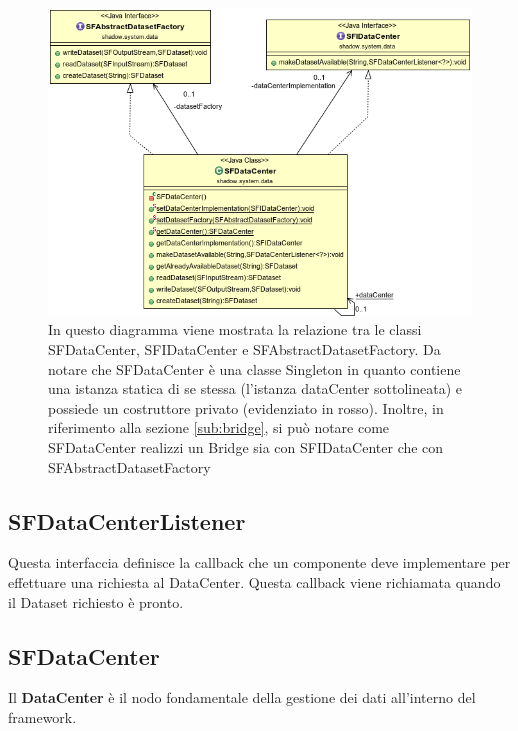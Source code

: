 \begin{figure}
\begin{center}
\includegraphics[width=\textwidth]{Immagini/DataCenterBridge}
\caption{In questo diagramma viene mostrata la relazione tra le classi SFDataCenter, SFIDataCenter e SFAbstractDatasetFactory. Da notare che SFDataCenter \`e una classe Singleton in quanto contiene una istanza statica di se stessa (l'istanza dataCenter sottolineata) e possiede un costruttore privato (evidenziato in rosso). Inoltre, in riferimento alla sezione \ref{sub:bridge}, si pu\`o notare come SFDataCenter realizzi un Bridge sia con SFIDataCenter che con SFAbstractDatasetFactory \label{f:datacenterbridge}} 
\end{center} 
\end{figure}

\subsection{SFDataCenterListener}
\label{sub:sfdatacenterlistener}
Questa interfaccia definisce la callback che un componente deve implementare per effettuare una richiesta al DataCenter.
Questa callback viene richiamata quando il Dataset richiesto \`e pronto.

\subsection{SFDataCenter}
\label{sub:sfdatacenter} 
Il \textbf{DataCenter} \`e il nodo fondamentale della gestione dei dati all'interno del framework. 

